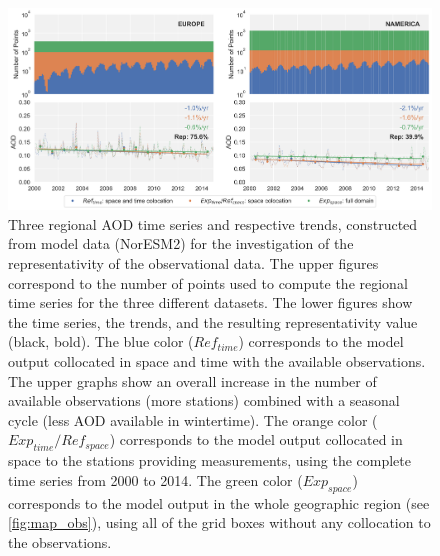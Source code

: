 \documentclass[acp, manuscript]{copernicus}
\begin{document}
\clearpage
\begin{figure}[t]
 \includegraphics[width=16cm]{../scripts/figs/representativity-od550aer.png}
 \caption{Three regional AOD time series and respective trends,  constructed from model data (NorESM2) for the investigation of the representativity of the observational data. The upper figures correspond to the number of points used to compute the regional time series for the three different datasets. The lower figures show the time series, the trends, and the resulting representativity value (black, bold). The blue color ($Ref_{time}$) corresponds to the model output collocated in space and time with the available observations. The upper graphs show an overall increase in the number of available observations (more stations) combined with a seasonal cycle (less AOD available in wintertime). The orange color ($Exp_{time}/Ref_{space}$) corresponds to the model output collocated in space to the stations providing measurements, using the complete time series from 2000 to 2014. The green color ($Exp_{space}$) corresponds to the model output in the whole geographic region (see \ref{fig:map_obs}), using all of the grid boxes without any collocation to the observations.}
 \label{fig:representativity}
\end{figure}
\end{document}
